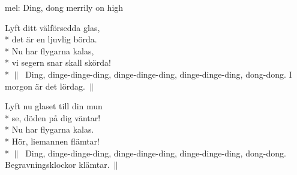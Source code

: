 \begin{SongText}
    \begin{SongInfo}
        mel: Ding, dong merrily on high
    \end{SongInfo}
    \begin{SongVerse}
        Lyft ditt välförsedda glas,\\*%
        det är en ljuvlig börda.\\*%
        Nu har flygarna kalas,\\*%
        vi segern snar skall skörda!\\*%
        $\|\:$ Ding, dinge-dinge-ding, dinge-dinge-ding, dinge-dinge-ding, dong-dong.
        I morgon är det lördag.$\:\|$
    \end{SongVerse}
    \begin{SongVerse}
        Lyft nu glaset till din mun\\*%
        se, döden på dig väntar!\\*%
        Nu har flygarna kalas.\\*%
        Hör, liemannen flämtar!\\*%
        $\|\:$ Ding, dinge-dinge-ding, dinge-dinge-ding, dinge-dinge-ding, dong-dong.
        Begravningsklockor klämtar.$\:\|$
    \end{SongVerse}
\end{SongText}
